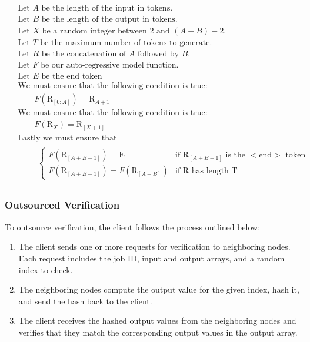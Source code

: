 \documentclass{article}
\begin{document}
\begin{align*}
    \begin{aligned}
        &\text{Let }A\text{ be the length of the input in tokens.}\\
        &\text{Let }B\text{ be the length of the output in tokens.}\\
        &\text{Let } X \text{ be a random integer between 2 and } (A + B) - 2. \\
        &\text{Let }T\text{ be the maximum number of tokens to generate.}\\
        &\text{Let }R\text{ be the concatenation of }A\text{ followed by }B.\\
        &\text{Let }F\text{ be our auto-regressive model function.}\\
        &\text{Let }E\text{ be the end token}\\
        &\text{We must ensure that the following condition is true:}\\
        &\qquad F(\text{R}_{[0:A]}) = \text{R}_{A+1} \\
        &\text{We must ensure that the following condition is true:} \\
        &\qquad F(\text{R}_X) = \text{R}_{[X+1]} \\
        &\text{Lastly we must ensure that} \\
        &\qquad \begin{aligned}
        \begin{cases}
            F(\text{R}_{[A+B-1]}) = \text{E} & \text{if } \text{R}_{[A+B-1]} \text{ is the }<\text{end}> \text{ token} \\
            F(\text{R}_{[A+B-1]}) = F(\text{R}_{[A+B]}) & \text{if } \text{R} \text{ has length } \text{T}
        \end{cases}
        \end{aligned}
    \end{aligned}
\end{align*}

\subsubsection{Outsourced Verification}
To outsource verification, the client follows the process outlined below:
\begin{enumerate}
\item The client sends one or more requests for verification to neighboring nodes. Each request includes the job ID, input and output arrays, and a random index to check.
\item The neighboring nodes compute the output value for the given index, hash it, and send the hash back to the client.
\item The client receives the hashed output values from the neighboring nodes and verifies that they match the corresponding output values in the output array.
\end{enumerate}
\end{document}
